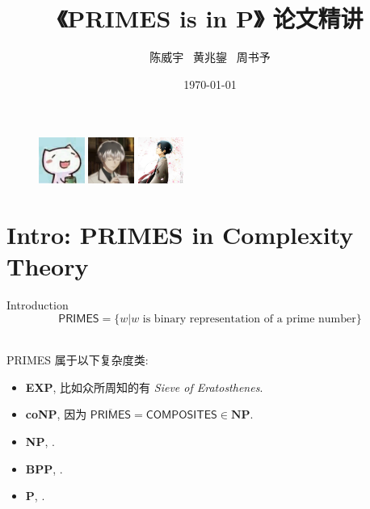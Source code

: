 \documentclass{beamer}
\author{陈威宇 \ 黄兆鋆 \ 周书予}
\title{《\textsf{PRIMES} is in \textbf{P}》 论文精讲}
\institute{信息科学技术学院}
\date{\today}
\begin{document}
\begin{frame}
    \titlepage
    \begin{figure}[htpb]
        \begin{center}
            \includegraphics[width=1.5cm]{cwy.jpg} \qquad
            \includegraphics[width=1.5cm]{hzj.jpg} \qquad
            \includegraphics[width=1.5cm]{zsy.jpg}
        \end{center}
    \end{figure}
\end{frame}

\begin{frame}
    \tableofcontents[sectionstyle=show,subsectionstyle=show/shaded/hide,subsubsectionstyle=show/shaded/hide]
\end{frame}

\section{Intro: PRIMES in Complexity Theory}
\begin{frame}{Introduction}
	$$\mathsf{PRIMES} = \{w | w \text{ is binary representation of a prime number}\}$$

	~\\

	\textsf{PRIMES} 属于以下复杂度类:
	\begin{itemize}
		\item \textbf{EXP}, 比如众所周知的有 \textit{Sieve of Eratosthenes}.
		\item \textbf{coNP}, 因为 $\overline{\textsf{PRIMES}} = \textsf{COMPOSITES} \in \textbf{NP}$.
		\item \textbf{NP}, \cite{Pratt75}.
		\item \textbf{BPP}, \cite{AB99}.
		\item \textbf{P}, \cite{AKS}.
	\end{itemize}

\end{frame}
\end{document}
